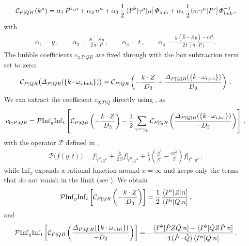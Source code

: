 \begin{align} \label{eq:ex_PQk}
\mathcal{C}_{P|QR}\left(k^{\mu}\right) = \alpha_1 \, P^{\flat, \, \mu}+ \alpha_2 \, n^{\mu} + \alpha_3 \, \frac{1}{2} \, \spAB{P^{\flat}}{\gamma^{\mu}}{n} \, \Phi_{\rm bub} + \alpha_4 \, \frac{1}{2} \spAB{n}{\gamma^{\mu}}{P^{\flat}} \, \Phi_{\rm bub}^{-1} \,,
\end{align}
with
\begin{align}
  \alpha_1 = y \,, \qquad 
  \alpha_2 = \frac{\hat{S}- S \, y}{2 \, n \cdot P} \,, \qquad
  \alpha_3 = t \,, \qquad
  \alpha_4 = \frac{y \, (\hat{S} - S \, y) - m_1^2}{2 \, t \, (n\cdot P)} \,.
\end{align}
The bubble coefficients $c_{i;P|QR}$ are fixed through  with the box subtraction term set to zero:
\begin{align}
\mathcal{C}_{P|QR} \bigl( \Delta_{P|QR}(\{k\cdot\omega_{i,{\rm bub}}\}) \bigr) = \mathcal{C}_{P|QR} \left( - \frac{k\cdot Z}{D_3} + \frac{\Delta_{P|Q|R}( \{k\cdot\omega_{i,{\rm tri}}\} )}{D_3}  \right)  \,.
\end{align}
We can extract the coefficient $c_{0;P|Q}$ directly using , as
\begin{align} \label{eq:c0PQ_extraction}
c_{0;P|QR} = \mathcal{P} \mathrm{Inf}_y \mathrm{Inf}_t \left[ \mathcal{C}_{P|QR}\left( - \frac{k\cdot Z}{D_3} \right) - \frac{1}{2} \sum_{\gamma=\gamma_{\pm}} \mathcal{C}_{P|QR}\left( \frac{\Delta_{P|Q|R}( \{k\cdot\omega_{i,{\rm tri}}\} )}{-D_3} \right) \right] \,,
\end{align}
with the operator $\mathcal{P}$ defined in ,
\begin{align}
  \mathcal{P}\bigl(f(y,t) \bigr) = f \bigl|_{t^0,y^0} + \frac{\hat{S}}{2 \, S}f \bigl|_{t^0,y^1}+ \frac{1}{3}\left( \frac{\hat{S}^2}{S^2} - \frac{m_1^2}{S} \right)f\bigl|_{t^0,y^2} \,,
\end{align}
while $\mathrm{Inf}_x$ expands a rational function around $x =\infty$ and keeps only the terms that do not vanish in the limit (see ).
We obtain
\begin{align} \label{eq:ex_tr_cut}
 \mathcal{P} \mathrm{Inf}_y \mathrm{Inf}_t \left[  \mathcal{C}_{P|QR}\left( -  \frac{k\cdot Z}{D_3} \right) \right] = \frac{1}{2} \, \frac{\langle P^{\flat} | Z | n ]}{\langle P^{\flat} | Q | n ]} \,,
\end{align}
and
\begin{align} \label{eq:ex_tr_sub}
 \mathcal{P} \mathrm{Inf}_y \mathrm{Inf}_t \left[ \mathcal{C}_{P|QR}\left( \frac{\Delta_{P|Q|R}( \{k\cdot\omega_{i,{\rm tri}}\} )}{ - D_3} \right) \right]  = - \frac{\langle P^{\flat}|\check{P} Z \check{Q}|n] + \langle P^{\flat}|\check{Q} Z \check{P}|n] }{4 \, (\check{P}\cdot \check{Q}) \, \spAB{P^{\flat}}{Q}{n} } \,.
\end{align}
